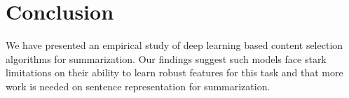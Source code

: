 \section{Conclusion}
We have presented an empirical study of deep learning based content selection
algorithms for summarization. Our findings suggest such models face stark limitations on their ability to learn robust features for this task and that 
more work is needed on sentence representation for summarization.


